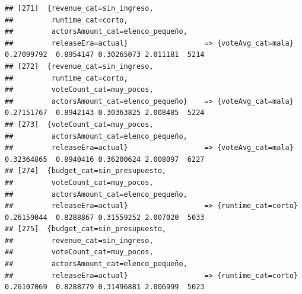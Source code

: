 \documentclass[
]{article}
\begin{document}
\begin{verbatim}
## [271]  {revenue_cat=sin_ingreso,                                                                                                
##         runtime_cat=corto,                                                                                                      
##         actorsAmount_cat=elenco_pequeño,                                                                                        
##         releaseEra=actual}                  => {voteAvg_cat=mala}                0.27099792  0.8954147 0.30265073 2.011181  5214
## [272]  {revenue_cat=sin_ingreso,                                                                                                
##         runtime_cat=corto,                                                                                                      
##         voteCount_cat=muy_pocos,                                                                                                
##         actorsAmount_cat=elenco_pequeño}    => {voteAvg_cat=mala}                0.27151767  0.8942143 0.30363825 2.008485  5224
## [273]  {voteCount_cat=muy_pocos,                                                                                                
##         actorsAmount_cat=elenco_pequeño,                                                                                        
##         releaseEra=actual}                  => {voteAvg_cat=mala}                0.32364865  0.8940416 0.36200624 2.008097  6227
## [274]  {budget_cat=sin_presupuesto,                                                                                             
##         voteCount_cat=muy_pocos,                                                                                                
##         actorsAmount_cat=elenco_pequeño,                                                                                        
##         releaseEra=actual}                  => {runtime_cat=corto}               0.26159044  0.8288867 0.31559252 2.007020  5033
## [275]  {budget_cat=sin_presupuesto,                                                                                             
##         revenue_cat=sin_ingreso,                                                                                                
##         voteCount_cat=muy_pocos,                                                                                                
##         actorsAmount_cat=elenco_pequeño,                                                                                        
##         releaseEra=actual}                  => {runtime_cat=corto}               0.26107069  0.8288779 0.31496881 2.006999  5023

\end{verbatim}
\end{document}
